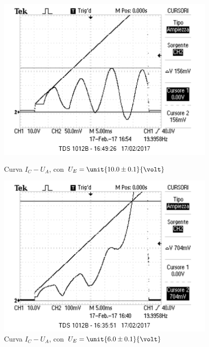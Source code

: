 \documentclass[10pt,a4paper]{article}
\begin{document}
\begin{figure}[H]
	\centering
	\begin{minipage}{0.49\textwidth}
		\centering
		\includegraphics[width=0.95\textwidth]{../oscilloscopio/Task9_9.png}
		\caption{Curva $I_{C} - U_{A}$, con $U_E = \unit{10.0 \pm 0.1}{\volt}$}
		\label{fig:UEex1}
	\end{minipage}
	\begin{minipage}{0.49\textwidth}
		\centering
		\includegraphics[width=0.95\textwidth]{../oscilloscopio/Task9_5.png}
		\caption{Curva $I_{C} - U_{A}$, con $U_E = \unit{6.0 \pm 0.1}{\volt}$}
		\label{fig:UEex2}
	\end{minipage}
	\begin{minipage}{0.55\textwidth}
		\centering

\end{minipage}
\end{figure}
\end{document}
